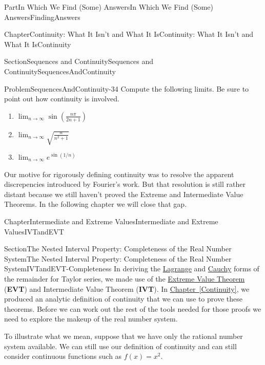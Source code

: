 \documentclass[oneside,10pt,]{book}
\newcommand{\xreffont}{\relax}
\newcommand{\terminology}[1]{\textbf{#1}}
\numberwithin{equation}{part}
\begin{document}
\begin{partptx}{Part}{In Which We Find (Some) Answers}{}{In Which We Find (Some) Answers}{}{}{FindingAnswers}
\begin{chapterptx}{Chapter}{Continuity: What It Isn't and What It Is}{}{Continuity: What It Isn't and What It Is}{}{}{Continuity}
\begin{sectionptx}{Section}{Sequences and Continuity}{}{Sequences and Continuity}{}{}{SequencesAndContinuity}
\begin{problem}{Problem}{}{SequencesAndContinuity-34}%
Compute the following limits. Be sure to point out how continuity is involved.%
\begin{enumerate}[font=\bfseries,label=(\alph*),ref=\alph*]%
\item{}\(\displaystyle\lim_{n\rightarrow\infty}\sin\left(\frac{n\pi}{2n+1}\right)\)%
\item{}\(\displaystyle\lim_{n\rightarrow\infty}\sqrt{\frac{n}{n^2+1}}\)%
\item{}\(\displaystyle\lim_{n\rightarrow\infty}e^{\sin (1/n)}\)%
\end{enumerate}%
\end{problem}
Our motive for rigorously defining continuity was to resolve the apparent discrepencies introduced by Fourier's work. But that resolution is still rather distant because we still haven't proved the Extreme and Intermediate Value Theorems. In the following chapter we will close that gap.%
\end{sectionptx}
\end{chapterptx}
%
%
\typeout{************************************************}
\typeout{************************************************}
%
\begin{chapterptx}{Chapter}{Intermediate and Extreme Values}{}{Intermediate and Extreme Values}{}{}{IVTandEVT}
\renewcommand*{\chaptername}{Chapter}
%
%
\typeout{************************************************}
\typeout{************************************************}
%
\begin{sectionptx}{Section}{The Nested Interval Property: Completeness of the Real Number System}{}{The Nested Interval Property: Completeness of the Real Number System}{}{}{IVTandEVT-Completeness}
In deriving the \hyperref[thm_LagrangeRemainder]{Lagrange} and \hyperref[thm_CauchyRemainder]{Cauchy} forms of the remainder for Taylor series, we made use of the \hyperref[thm_EVT]{Extreme Value Theorem} (\terminology{EVT}) and Intermediate Value Theorem (\terminology{IVT}).  In \hyperref[Continuity]{Chapter~{\xreffont\ref{Continuity}}}, we produced an analytic definition of continuity that we can use to prove these theorems.  Before we can work out the rest of the tools needed for those proofs we need to explore the make\textendash{}up of the real number system.%
\par
To illustrate what we mean, suppose that we have only the rational number system available.  We can still use our definition of continuity and can still consider continuous functions such as \(f(x)=x^2\).%

\end{sectionptx}
\end{chapterptx}
\end{partptx}
\end{document}

